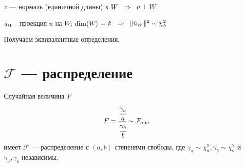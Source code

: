 \documentclass[12pt]{article} %
\theoremstyle{definition} %
\begin{document}
   

 $v$ — нормаль (единичной длины) к $W \hspace{0.2cm} \Rightarrow \hspace{0.2cm} v \perp W$ \par
 $\hat u_W$ - проекция $u$ на $W$; dim($W$) $=k \hspace{0.2cm} \Rightarrow \hspace{0.2cm} \lVert \hat u_W \rVert ^2 \sim \mathcal{\chi}_k^2 \hspace{0.2cm}$ \par
 Получаем эквивалентные определения.


\section{$\mathcal{F}$ — распределение}
\begin{classic_def}\hspace{2cm} \par
    \smallskip
    Случайная величина $F$
    \[
        F = \cfrac{\cfrac{\gamma_a}{a}}{\cfrac{\gamma_b}{b}} \sim \mathcal{F}_{a,b}, 
    \]
    имеет $\mathcal{F}$ — распределение с $(a,b)$ степенями свободы, где $\gamma_a \sim \mathcal{\chi}_{a}^2, \gamma_b \sim \mathcal{\chi}_{b}^2$ и $\gamma_a, \gamma_b$ независимы.
    \end{classic_def}
\end{document}
